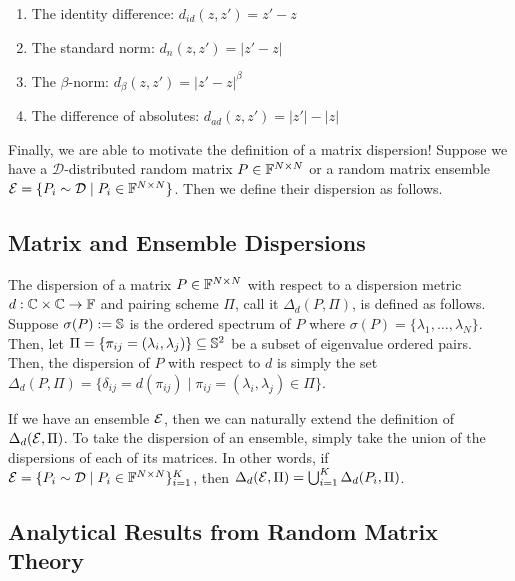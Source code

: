 \begin{enumerate}
\item The identity difference: $d_{id}(z,z') = z' - z$
\item The standard norm: $d_{n}(z,z') = |z' - z|$
\item The $\beta$-norm: $d_\beta(z,z') = |z' - z|^\beta$
\item The difference of absolutes: $d_{ad}(z,z') = |z'| - |z|$
\end{enumerate}

Finally, we are able to motivate the definition of a matrix dispersion! Suppose we have a $\mathcal{D}$-distributed random matrix $P \in \F^{N \times N}$ or a random matrix ensemble $\Ens = \{P_i \sim \mathcal{D} \mid P_i \in \F^{N \times N}\}$. Then we define their dispersion as follows. 

\subsection{Matrix and Ensemble Dispersions}

\begin{definition}[Dispersion]
The dispersion of a matrix $P \in \F^{N \times N}$ with respect to a dispersion metric $d: \Cc \times \Cc \to \F$ and pairing scheme $\Pi$, call it $\Delta_d(P, \Pi)$, is defined as follows. Suppose $\sigma(P) := \S$ is the ordered spectrum of $P$ where $\sigma(P) = \{\lambda_1, \dots, \lambda_N\}$. Then, let $\Pi = \{\pi_{ij} = (\lambda_i,\lambda_j) \} \subseteq \S^2$ be a subset of eigenvalue ordered pairs. Then, the dispersion of $P$ with respect to $d$ is simply the set $\Delta_d(P, \Pi)=\{\delta_{ij} = d(\pi_{ij}) \mid \pi_{ij} = (\lambda_i,\lambda_j) \in \Pi\}$.
\end{definition}

\begin{definition}
If we have an ensemble $\Ens$, then we can naturally extend the definition of $\Delta_d(\Ens, \Pi)$. To take the dispersion of an ensemble, simply take the union of the dispersions of each of its matrices. In other words, if $\Ens = \{P_i \sim \mathcal{D} \mid P_i \in \F^{N \times N}\}_{i = 1}^K$, then $\Delta_d(\Ens, \Pi) = \bigcup_{i=1}^K \Delta_d(P_i, \Pi)$.
\end{definition}

\subsection{Analytical Results from Random Matrix Theory}